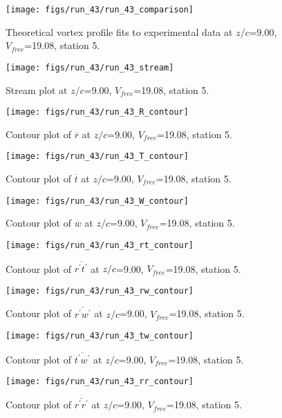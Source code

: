 \begin{figure}[H]
\centering
\texttt{[image: figs/run\_43/run\_43\_comparison]}
\caption{Theoretical vortex profile fits to experimental data at $z/c$=9.00, $V_{free}$=19.08, station 5.}
\end{figure}


\begin{figure}[H]
\centering
\texttt{[image: figs/run\_43/run\_43\_stream]}
\caption{Stream plot at $z/c$=9.00, $V_{free}$=19.08, station 5.}
\end{figure}


\begin{figure}[H]
\centering
\texttt{[image: figs/run\_43/run\_43\_R\_contour]}
\caption{Contour plot of $\overline{r}$ at $z/c$=9.00, $V_{free}$=19.08, station 5.}
\end{figure}


\begin{figure}[H]
\centering
\texttt{[image: figs/run\_43/run\_43\_T\_contour]}
\caption{Contour plot of $\overline{t}$ at $z/c$=9.00, $V_{free}$=19.08, station 5.}
\end{figure}


\begin{figure}[H]
\centering
\texttt{[image: figs/run\_43/run\_43\_W\_contour]}
\caption{Contour plot of $\overline{w}$ at $z/c$=9.00, $V_{free}$=19.08, station 5.}
\end{figure}


\begin{figure}[H]
\centering
\texttt{[image: figs/run\_43/run\_43\_rt\_contour]}
\caption{Contour plot of $\overline{r^\prime t^\prime}$ at $z/c$=9.00, $V_{free}$=19.08, station 5.}
\end{figure}


\begin{figure}[H]
\centering
\texttt{[image: figs/run\_43/run\_43\_rw\_contour]}
\caption{Contour plot of $\overline{r^\prime w^\prime}$ at $z/c$=9.00, $V_{free}$=19.08, station 5.}
\end{figure}


\begin{figure}[H]
\centering
\texttt{[image: figs/run\_43/run\_43\_tw\_contour]}
\caption{Contour plot of $\overline{t^\prime w^\prime}$ at $z/c$=9.00, $V_{free}$=19.08, station 5.}
\end{figure}


\begin{figure}[H]
\centering
\texttt{[image: figs/run\_43/run\_43\_rr\_contour]}
\caption{Contour plot of $\overline{r^\prime r^\prime}$ at $z/c$=9.00, $V_{free}$=19.08, station 5.}
\end{figure}


